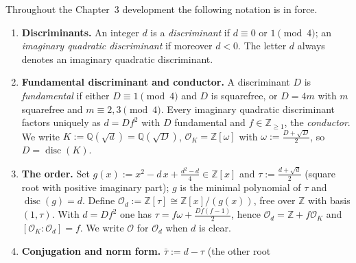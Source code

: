 
\begin{definition}
  \label{notation}
  Throughout the Chapter~3 development the following notation is in force.
  \begin{enumerate}
    \item[(N1)] \textbf{Discriminants.} An integer $d$ is a \emph{discriminant} if
      $d \equiv 0$ or $1 \pmod 4$; an \emph{imaginary quadratic discriminant} if moreover
      $d < 0$. The letter $d$ always denotes an imaginary quadratic discriminant.
    \item[(N2)] \textbf{Fundamental discriminant and conductor.} A discriminant $D$ is
      \emph{fundamental} if either $D \equiv 1 \pmod 4$ and $D$ is squarefree, or $D = 4m$
      with $m$ squarefree and $m \equiv 2, 3 \pmod 4$. Every imaginary quadratic
      discriminant factors uniquely as $d = D f^2$ with $D$ fundamental and
      $f \in \mathbb{Z}_{\geq 1}$, the \emph{conductor}. We write
      $K := \mathbb{Q}(\sqrt d) = \mathbb{Q}(\sqrt D)$,
      $\mathcal{O}_K = \mathbb{Z}[\omega]$ with $\omega := \frac{D + \sqrt D}{2}$, so
      $D = \operatorname{disc}(K)$.
    \item[(N3)] \textbf{The order.} Set
      $g(x) := x^2 - d\,x + \frac{d^2 - d}{4} \in \mathbb{Z}[x]$ and
      $\tau := \frac{d + \sqrt d}{2}$ (square root with positive imaginary part); $g$ is
      the minimal polynomial of $\tau$ and $\operatorname{disc}(g) = d$. Define
      $\mathcal{O}_d := \mathbb{Z}[\tau] \cong \mathbb{Z}[x]/(g(x))$, free over
      $\mathbb{Z}$ with basis $(1, \tau)$. With $d = D f^2$ one has
      $\tau = f\omega + \frac{Df(f-1)}{2}$, hence
      $\mathcal{O}_d = \mathbb{Z} + f\mathcal{O}_K$ and
      $[\mathcal{O}_K : \mathcal{O}_d] = f$. We write $\mathcal{O}$ for $\mathcal{O}_d$
      when $d$ is clear.
    \item[(N4)] \textbf{Conjugation and norm form.} $\bar\tau := d - \tau$ (the other root

\end{enumerate}
\end{definition}
